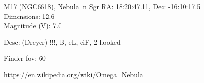 \begin{block}{M17 (NGC6618), Nebula in Sgr}
    RA: 18:20:47.11, Dec: -16:10:17.5 \\ 
    Dimensions: 12.6 \\ 
    Magnitude (V): 7.0


    Desc: (Dreyer) !!!, B, eL, eiF, 2 hooked 

    Finder fov: 60 

    \url{https://en.wikipedia.org/wiki/Omega_Nebula} 
\end{block}